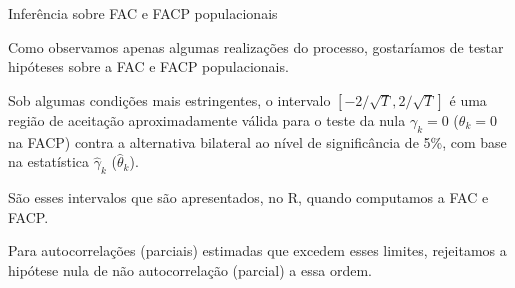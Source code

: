 \documentclass[11pt]{beamer}
\newenvironment{halfwideitemize}{\itemize\addtolength{\itemsep}{0.5em}}{\enditemize}
\begin{document}
\begin{frame}{Inferência sobre FAC e FACP populacionais}
	\begin{halfwideitemize}
				\item Como observamos apenas algumas realizações do processo, gostaríamos de testar hipóteses sobre a FAC e FACP populacionais.
		\item Sob algumas condições mais estringentes, o intervalo $[-2/\sqrt{T}, 2/\sqrt{T}]$ é uma região de aceitação aproximadamente válida para o teste da nula $\gamma_k=0$ ($\theta_k =0$ na FACP)  contra a alternativa bilateral ao nível de significância de 5\%, com base na estatística $\hat \gamma_k$ ($\hat \theta_k$).
		\begin{halfwideitemize}
			\item São esses intervalos que são apresentados, no R, quando computamos a FAC e FACP.
			\item Para autocorrelações (parciais) estimadas que excedem esses limites, rejeitamos a hipótese nula de não autocorrelação (parcial) a essa ordem.
		\end{halfwideitemize}
	
	\end{halfwideitemize}

\end{frame}
\end{document}
